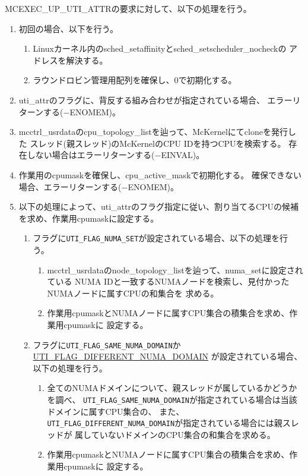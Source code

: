 \documentclass[twoside,11pt,fleqn]{book}
\newcommand\textttw[1]{\mathchardef\UrlBreakPenalty=100\mathchardef\UrlBigBreakPenalty=100\url{#1}}
\newcounter{subsubsubsection}[subsubsection]
\begin{document}
MCEXEC\_UP\_UTI\_ATTRの要求に対して、以下の処理を行う。
\begin{enumerate}
\item 初回の場合、以下を行う。
\begin{enumerate}
\item Linuxカーネル内のsched\_setaffinityとsched\_setscheduler\_nocheckの
アドレスを解決する。
\item ラウンドロビン管理用配列を確保し、0で初期化する。
\end{enumerate}
\item uti\_attrのフラグに、背反する組み合わせが指定されている場合、
エラーリターンする($-$ENOMEM)。
\item mcctrl\_usrdataのcpu\_topology\_listを辿って、McKernelにてcloneを発行した
スレッド(親スレッド)のMcKernelのCPU IDを持つCPUを検索する。
存在しない場合はエラーリターンする($-$EINVAL)。
\item 作業用のcpumaskを確保し、cpu\_active\_maskで初期化する。
確保できない場合、エラーリターンする($-$ENOMEM)。
\item 以下の処理によって、uti\_attrのフラグ指定に従い、割り当てるCPUの候補
を求め、作業用cpumaskに設定する。
\begin{enumerate}
\item フラグに\texttt{UTI\_FLAG\_NUMA\_SET}が設定されている場合、以下の処理を行う。
\begin{enumerate}
\item mcctrl\_usrdataのnode\_topology\_listを辿って、numa\_setに設定されている
NUMA IDと一致するNUMAノードを検索し、見付かったNUMAノードに属すCPUの和集合を
求める。
\item 作業用cpumaskとNUMAノードに属すCPU集合の積集合を求め、作業用cpumaskに
設定する。
\end{enumerate}
\item フラグに\texttt{UTI\_FLAG\_SAME\_NUMA\_DOMAIN}か\textttw{UTI\_FLAG\_DIFFERENT\_NUMA\_DOMAIN}
が設定されている場合、以下の処理を行う。
\begin{enumerate}
\item 全てのNUMAドメインについて、親スレッドが属しているかどうかを調べ、
\texttt{UTI\_FLAG\_SAME\_NUMA\_DOMAIN}が指定されている場合は当該ドメインに属すCPU集合の、
また、\texttt{UTI\_FLAG\_DIFFERENT\_NUMA\_DOMAIN}が指定されている場合には親スレッドが
属していないドメインのCPU集合の和集合を求める。
\item 作業用cpumaskとNUMAノードに属すCPU集合の積集合を求め、作業用cpumaskに
設定する。
\end{enumerate}

\end{enumerate}
\end{enumerate}
\end{document}
